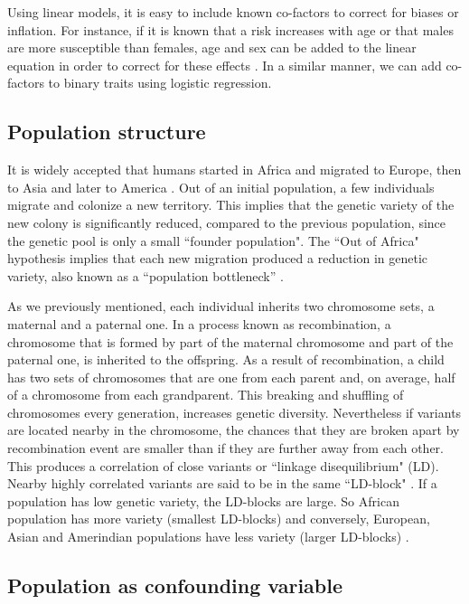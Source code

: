 Using linear models, it is easy to include known co-factors to correct for biases or inflation. For instance, if it is known that a risk increases with age or that males are more susceptible than females, age and sex can be added to the linear equation in order to correct for these effects \cite{balding2006tutorial,clarke2011basic}. In a similar manner, we can add co-factors to binary traits using logistic regression.

\subsection{Population structure}

It is widely accepted that humans started in Africa and migrated to Europe, then to Asia and later to America \cite{hartl1997principles}. Out of an initial population, a few individuals migrate and colonize a new territory. This implies that the genetic variety of the new colony is significantly reduced, compared to the previous population, since the genetic pool is only a small ``founder population". The ``Out of Africa" hypothesis implies that each new migration produced a reduction in genetic variety, also known as a ``population bottleneck'' \cite{hartl1997principles}.

As we previously mentioned, each individual inherits two chromosome sets, a maternal and a paternal one. In a process known as recombination, a chromosome that is formed by part of the maternal chromosome and part of the paternal one, is inherited to the offspring. As a result of recombination, a child has two sets of chromosomes that are one from each parent and, on average, half of a chromosome from each grandparent. This breaking and shuffling of chromosomes every generation, increases genetic diversity. Nevertheless if variants are located nearby in the chromosome, the chances that they are broken apart by recombination event are smaller than if they are further away from each other. This produces a correlation of close variants or ``linkage disequilibrium" (LD). Nearby highly correlated variants are said to be in the same ``LD-block" \cite{hartl1997principles}. If a population has low genetic variety, the LD-blocks are large. So African population has more variety (smallest LD-blocks) and conversely, European, Asian and Amerindian populations have less variety (larger LD-blocks) \cite{hartl1997principles}.

\subsection{Population as confounding variable }

